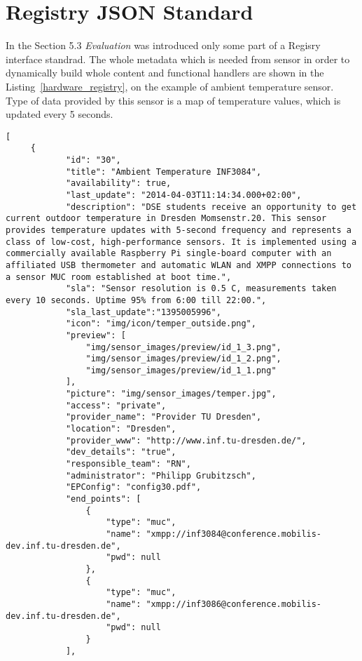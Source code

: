 \chapter{Registry JSON Standard}
In the Section 5.3 \emph{Evaluation} was introduced only some part of a Regisry interface standrad. The whole metadata which is needed from sensor in order to dynamically build whole content and functional handlers are shown in the Listing~\ref{hardware_registry}, on the example of ambient temperature sensor. Type of data provided by this sensor is a map of temperature values, which is updated every 5 seconds.
\begin{lstlisting}[label=hardware_registry,caption=JSON Description Format]
[
     {
            "id": "30",
            "title": "Ambient Temperature INF3084",
            "availability": true,
            "last_update": "2014-04-03T11:14:34.000+02:00",
            "description": "DSE students receive an opportunity to get current outdoor temperature in Dresden Momsenstr.20. This sensor provides temperature updates with 5-second frequency and represents a class of low-cost, high-performance sensors. It is implemented using a commercially available Raspberry Pi single-board computer with an affiliated USB thermometer and automatic WLAN and XMPP connections to a sensor MUC room established at boot time.",
            "sla": "Sensor resolution is 0.5 C, measurements taken every 10 seconds. Uptime 95% from 6:00 till 22:00.",
            "sla_last_update":"1395005996",
            "icon": "img/icon/temper_outside.png",
            "preview": [
                "img/sensor_images/preview/id_1_3.png",
                "img/sensor_images/preview/id_1_2.png",
                "img/sensor_images/preview/id_1_1.png"
            ],
            "picture": "img/sensor_images/temper.jpg",
            "access": "private",
            "provider_name": "Provider TU Dresden",
            "location": "Dresden",
            "provider_www": "http://www.inf.tu-dresden.de/",
            "dev_details": "true",
            "responsible_team": "RN",
            "administrator": "Philipp Grubitzsch",
            "EPConfig": "config30.pdf",
            "end_points": [
                {
                    "type": "muc",
                    "name": "xmpp://inf3084@conference.mobilis-dev.inf.tu-dresden.de",
                    "pwd": null
                },
                {
                    "type": "muc",
                    "name": "xmpp://inf3086@conference.mobilis-dev.inf.tu-dresden.de",
                    "pwd": null
                }
            ],

\end{lstlisting}
